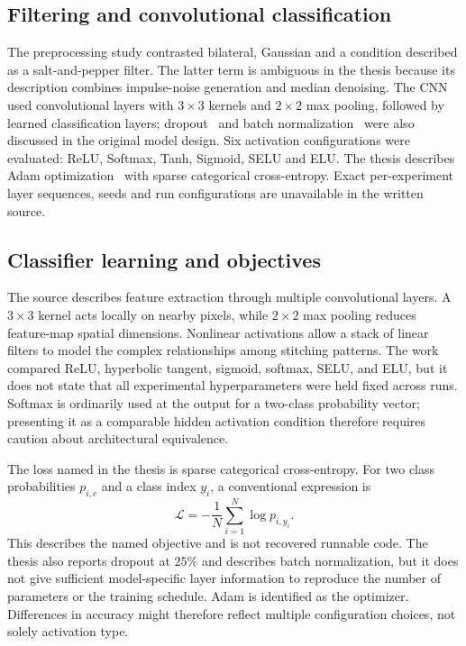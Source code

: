 \documentclass[conference,a4paper]{IEEEtran}
\begin{document}
\subsection{Filtering and convolutional classification}
The preprocessing study contrasted bilateral, Gaussian and a condition described as a salt-and-pepper filter. The latter term is ambiguous in the thesis because its description combines impulse-noise generation and median denoising. The CNN used convolutional layers with $3\times3$ kernels and $2\times2$ max pooling, followed by learned classification layers; dropout~\cite{dropout} and batch normalization~\cite{batchnorm} were also discussed in the original model design. Six activation configurations were evaluated: ReLU, Softmax, Tanh, Sigmoid, SELU and ELU. The thesis describes Adam optimization~\cite{adam} with sparse categorical cross-entropy. Exact per-experiment layer sequences, seeds and run configurations are unavailable in the written source.

\subsection{Classifier learning and objectives}
The source describes feature extraction through multiple convolutional layers. A $3\times3$ kernel acts locally on nearby pixels, while $2\times2$ max pooling reduces feature-map spatial dimensions. Nonlinear activations allow a stack of linear filters to model the complex relationships among stitching patterns. The work compared ReLU, hyperbolic tangent, sigmoid, softmax, SELU, and ELU, but it does not state that all experimental hyperparameters were held fixed across runs. Softmax is ordinarily used at the output for a two-class probability vector; presenting it as a comparable hidden activation condition therefore requires caution about architectural equivalence.

The loss named in the thesis is sparse categorical cross-entropy. For two class probabilities $p_{i,c}$ and a class index $y_i$, a conventional expression is
\begin{equation}
\mathcal{L}=-\frac1N\sum_{i=1}^{N}\log p_{i,y_i}.
\end{equation}
This describes the named objective and is not recovered runnable code. The thesis also reports dropout at $25\%$ and describes batch normalization, but it does not give sufficient model-specific layer information to reproduce the number of parameters or the training schedule. Adam is identified as the optimizer. Differences in accuracy might therefore reflect multiple configuration choices, not solely activation type.
\end{document}

